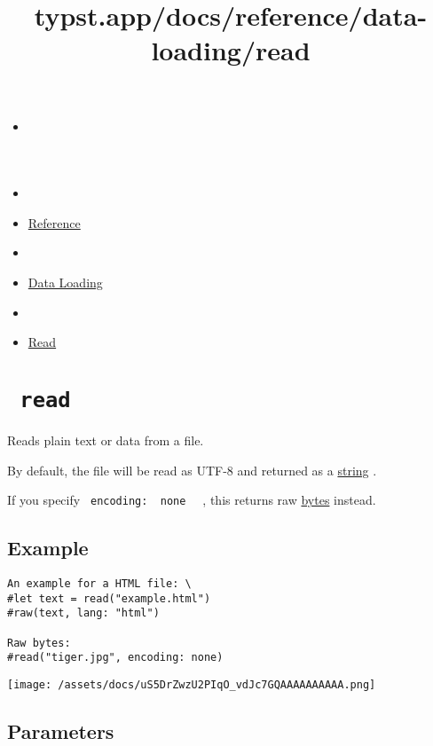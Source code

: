 \title{typst.app/docs/reference/data-loading/read}

\begin{itemize}
\tightlist
\item
  \href{/docs}{}
\item
  
\item
  \href{/docs/reference/}{Reference}
\item
  
\item
  \href{/docs/reference/data-loading/}{Data Loading}
\item
  
\item
  \href{/docs/reference/data-loading/read/}{Read}
\end{itemize}

\section{\texorpdfstring{\texttt{\ read\ }}{ read }}\label{summary}

Reads plain text or data from a file.

By default, the file will be read as UTF-8 and returned as a
\href{/docs/reference/foundations/str/}{string} .

If you specify \texttt{\ encoding:\ }{\texttt{\ none\ }}\texttt{\ } ,
this returns raw \href{/docs/reference/foundations/bytes/}{bytes}
instead.

\subsection{Example}\label{example}

\begin{verbatim}
An example for a HTML file: \
#let text = read("example.html")
#raw(text, lang: "html")

Raw bytes:
#read("tiger.jpg", encoding: none)
\end{verbatim}

\texttt{[image: /assets/docs/uS5DrZwzU2PIqO\_vdJc7GQAAAAAAAAAA.png]}

\subsection{\texorpdfstring{{ Parameters
}}{ Parameters }}\label{parameters}

